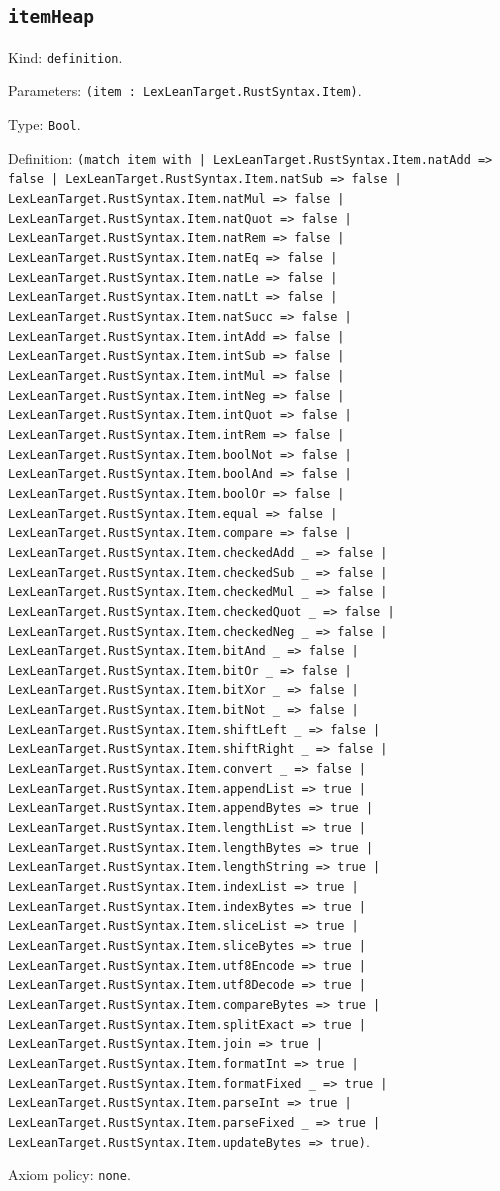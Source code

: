 \documentclass[11pt]{article}
\begin{document}
\subsection*{\texttt{itemHeap}}
\noindent Kind: \texttt{definition}.\par
\noindent Parameters: \texttt{(item : LexLeanTarget.RustSyntax.Item)}.\par
\noindent Type: \texttt{Bool}.\par
\noindent Definition: \texttt{(match item with | LexLeanTarget.RustSyntax.Item.natAdd => false | LexLeanTarget.RustSyntax.Item.natSub => false | LexLeanTarget.RustSyntax.Item.natMul => false | LexLeanTarget.RustSyntax.Item.natQuot => false | LexLeanTarget.RustSyntax.Item.natRem => false | LexLeanTarget.RustSyntax.Item.natEq => false | LexLeanTarget.RustSyntax.Item.natLe => false | LexLeanTarget.RustSyntax.Item.natLt => false | LexLeanTarget.RustSyntax.Item.natSucc => false | LexLeanTarget.RustSyntax.Item.intAdd => false | LexLeanTarget.RustSyntax.Item.intSub => false | LexLeanTarget.RustSyntax.Item.intMul => false | LexLeanTarget.RustSyntax.Item.intNeg => false | LexLeanTarget.RustSyntax.Item.intQuot => false | LexLeanTarget.RustSyntax.Item.intRem => false | LexLeanTarget.RustSyntax.Item.boolNot => false | LexLeanTarget.RustSyntax.Item.boolAnd => false | LexLeanTarget.RustSyntax.Item.boolOr => false | LexLeanTarget.RustSyntax.Item.equal => false | LexLeanTarget.RustSyntax.Item.compare => false | LexLeanTarget.RustSyntax.Item.checkedAdd \_ => false | LexLeanTarget.RustSyntax.Item.checkedSub \_ => false | LexLeanTarget.RustSyntax.Item.checkedMul \_ => false | LexLeanTarget.RustSyntax.Item.checkedQuot \_ => false | LexLeanTarget.RustSyntax.Item.checkedNeg \_ => false | LexLeanTarget.RustSyntax.Item.bitAnd \_ => false | LexLeanTarget.RustSyntax.Item.bitOr \_ => false | LexLeanTarget.RustSyntax.Item.bitXor \_ => false | LexLeanTarget.RustSyntax.Item.bitNot \_ => false | LexLeanTarget.RustSyntax.Item.shiftLeft \_ => false | LexLeanTarget.RustSyntax.Item.shiftRight \_ => false | LexLeanTarget.RustSyntax.Item.convert \_ => false | LexLeanTarget.RustSyntax.Item.appendList => true | LexLeanTarget.RustSyntax.Item.appendBytes => true | LexLeanTarget.RustSyntax.Item.lengthList => true | LexLeanTarget.RustSyntax.Item.lengthBytes => true | LexLeanTarget.RustSyntax.Item.lengthString => true | LexLeanTarget.RustSyntax.Item.indexList => true | LexLeanTarget.RustSyntax.Item.indexBytes => true | LexLeanTarget.RustSyntax.Item.sliceList => true | LexLeanTarget.RustSyntax.Item.sliceBytes => true | LexLeanTarget.RustSyntax.Item.utf8Encode => true | LexLeanTarget.RustSyntax.Item.utf8Decode => true | LexLeanTarget.RustSyntax.Item.compareBytes => true | LexLeanTarget.RustSyntax.Item.splitExact => true | LexLeanTarget.RustSyntax.Item.join => true | LexLeanTarget.RustSyntax.Item.formatInt => true | LexLeanTarget.RustSyntax.Item.formatFixed \_ => true | LexLeanTarget.RustSyntax.Item.parseInt => true | LexLeanTarget.RustSyntax.Item.parseFixed \_ => true | LexLeanTarget.RustSyntax.Item.updateBytes => true)}.\par
\noindent Axiom policy: \texttt{none}.\par
\end{document}
